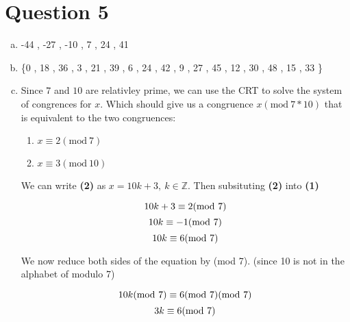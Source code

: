 \documentclass{article}
\numberwithin{equation}{subsection}
\begin{document}
	\newpage
	\thispagestyle{fancy}



	\section*{Question 5}
	
	\begin{enumerate}[(a)]
		\item -44 , -27 , -10 , 7 , 24 , 41 
		\item \{0 , 18 , 36 , 3 , 21 , 39 , 6 , 24 , 42 , 9 , 27 , 45 , 12 , 30 , 48 , 15 , 33 \}
		\vspace{10pt}
		\item \par{	
			\begin{adjustwidth}{10pt}{}
				Since $7$ and $10$ are relativley prime, we can use the CRT to solve the system of
				congrences for $x$. Which should give us a congruence $x(\textrm{mod}\ 7*10)$ that 
				is equivalent to the two congruences:

				\begin{enumerate}[(1)]
					\item $x\equiv 2(\textrm{mod}\ 7)$
					\item $x\equiv 3(\textrm{mod}\ 10)$
				\end{enumerate}
				
				We can write \textbf{(2)} as $x = 10k +3,\ k\in \mathbb{Z}$. Then subsituting \textbf{(2)} into \textbf{(1)}

				\begin{equation}\notag
					10k + 3 \equiv 2(\textrm{mod}\ 7)	
				\end{equation}
				\begin{equation}\notag
					10k \equiv -1(\textrm{mod}\ 7)	
				\end{equation}
				\begin{equation}\notag
					10k \equiv 6 (\textrm{mod}\ 7)	
				\end{equation}
				
				We now reduce both sides of the equation by (mod 7). (since 10 is not in the alphabet of modulo 7)
				
				\begin{equation}\notag
					10k (\textrm{mod}\ 7) \equiv 6 (\textrm{mod}\ 7) (\textrm{mod}\ 7)	
				\end{equation}
				\begin{equation}\notag
					3k \equiv 6 (\textrm{mod}\ 7)	
				\end{equation}


\end{adjustwidth}}
\end{enumerate}
\end{document}
